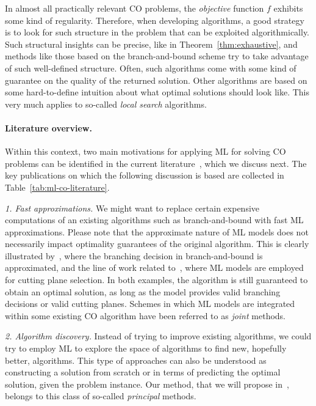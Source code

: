 \documentclass[a4paper]{report}
\theoremstyle{definition}
\theoremstyle{plain}
\begin{document}
In almost all practically relevant CO problems, the \emph{objective} function
$f$ exhibits some kind of regularity.
%
Therefore, when developing algorithms, a good strategy is to look for such
structure in the problem that can be exploited algorithmically.
%
Such structural insights can be precise, like in Theorem~\ref{thm:exhaustive}, and methods like
those based on the branch-and-bound scheme try to take advantage of such
well-defined structure. Often, such algorithms come with some kind of guarantee
on the quality of the returned solution.
%
Other algorithms are based on some hard-to-define intuition about what optimal
solutions should look like.
%
This very much applies to so-called \emph{local search} algorithms.

\paragraph{Literature overview.}
Within this context, two main motivations for applying ML for solving CO
problems can be identified in the current
literature~\cite{bengioMachineLearningCombinatorial2020}, which we discuss next.
%
The key publications on which the following discussion is based are collected in
Table~\ref{tab:ml-co-literature}.

\emph{1. Fast approximations.}
%
We might want to replace certain expensive computations of an existing
algorithms such as branch-and-bound with fast ML approximations.
%
Please note that the approximate nature of ML models does not necessarily impact
optimality guarantees of the original algorithm.
%
This is clearly illustrated by~\cite{gasseExactCombinatorialOptimization2019}, where the branching decision in
branch-and-bound is approximated, and the line of work related to~\cite{tangReinforcementLearningInteger2020}, where
ML models are employed for cutting plane selection.
%
In both examples, the algorithm is still guaranteed to obtain an optimal
solution, as long as the model provides valid branching decisions or valid
cutting planes.
%
Schemes in which ML models are integrated within some existing CO algorithm have
been referred to as \emph{joint} methods.

\emph{2. Algorithm discovery.}
%
Instead of trying to improve existing algorithms, we could try to employ ML to
explore the space of algorithms to find new, hopefully better, algorithms.
%
This type of approaches can also be understood as constructing a solution from
scratch or in terms of predicting the optimal solution, given the problem
instance.
%
Our method, that we will propose in~, belongs to this
class of so-called \emph{principal} methods.
\end{document}
